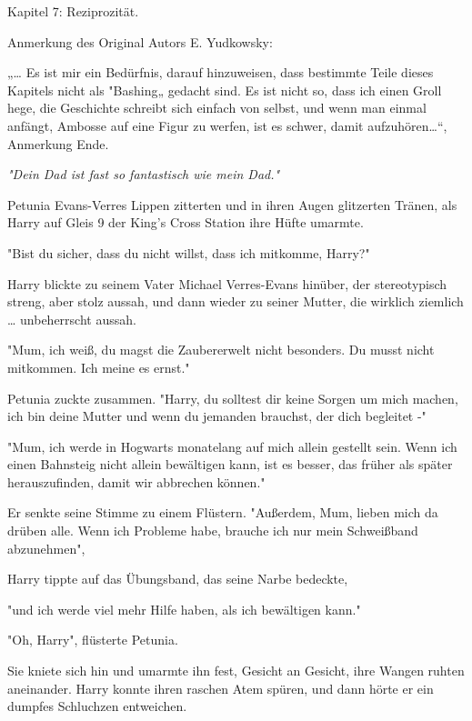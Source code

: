 

\hypertarget{reziprozituxe4t}{%

Kapitel 7: Reziprozität.

Anmerkung des Original Autors E. Yudkowsky:

„… Es ist mir ein Bedürfnis, darauf hinzuweisen, dass bestimmte Teile dieses Kapitels nicht als "Bashing„ gedacht sind. Es ist nicht so, dass ich einen Groll hege, die Geschichte schreibt sich einfach von selbst, und wenn man einmal anfängt, Ambosse auf eine Figur zu werfen, ist es schwer, damit aufzuhören…“, Anmerkung Ende.

\emph{"Dein Dad ist fast so fantastisch wie mein Dad."}

Petunia Evans-Verres Lippen zitterten und in ihren Augen glitzerten Tränen, als Harry auf Gleis 9 der King's Cross Station ihre Hüfte umarmte.

"Bist du sicher, dass du nicht willst, dass ich mitkomme, Harry?"

Harry blickte zu seinem Vater Michael Verres-Evans hinüber, der stereotypisch streng, aber stolz aussah, und dann wieder zu seiner Mutter, die wirklich ziemlich … unbeherrscht aussah.

"Mum, ich weiß, du magst die Zaubererwelt nicht besonders. Du musst nicht mitkommen. Ich meine es ernst."

Petunia zuckte zusammen. "Harry, du solltest dir keine Sorgen um mich machen, ich bin deine Mutter und wenn du jemanden brauchst, der dich begleitet -"

"Mum, ich werde in Hogwarts monatelang auf mich allein gestellt sein. Wenn ich einen Bahnsteig nicht allein bewältigen kann, ist es besser, das früher als später herauszufinden, damit wir abbrechen können."

Er senkte seine Stimme zu einem Flüstern. "Außerdem, Mum, lieben mich da drüben alle. Wenn ich Probleme habe, brauche ich nur mein Schweißband abzunehmen",

Harry tippte auf das Übungsband, das seine Narbe bedeckte,

"und ich werde viel mehr Hilfe haben, als ich bewältigen kann."

"Oh, Harry", flüsterte Petunia.

Sie kniete sich hin und umarmte ihn fest, Gesicht an Gesicht, ihre Wangen ruhten aneinander. Harry konnte ihren raschen Atem spüren, und dann hörte er ein dumpfes Schluchzen entweichen.

}
